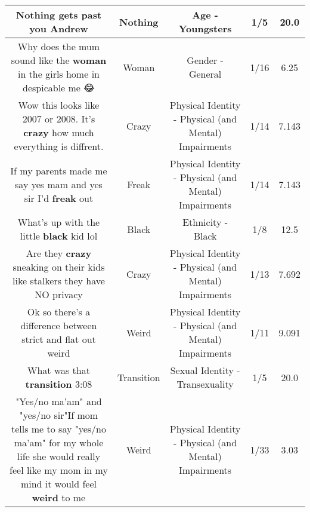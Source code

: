 \documentclass[11pt]{article}
\newlength\mylength
\begin{document}
\begin{center}
\begin{longtable}{|C{.65\mylength}|C{.30\mylength}|C{.12\mylength}|C{.12\mylength}|C{.12\mylength}|}
  \small Nothing gets past you Andrew\normalsize   & Nothing & Age - Youngsters & 1/5 & 20.0 \\  \hline
  \small Why does the mum sound like the \textbf{woman} in the girls home in despicable me 😂\normalsize   & Woman & Gender - General & 1/16 & 6.25 \\  \hline
  \small Wow this looks like 2007 or 2008. It's \textbf{crazy} how much everything is diffrent.\normalsize   & Crazy & Physical Identity - Physical (and Mental) Impairments & 1/14 & 7.143 \\  \hline
  \small If my parents made me say yes mam and yes sir I'd \textbf{freak} out\normalsize   & Freak & Physical Identity - Physical (and Mental) Impairments & 1/14 & 7.143 \\  \hline
  \small What's up with the little \textbf{black} kid lol\normalsize   & Black & Ethnicity - Black & 1/8 & 12.5 \\  \hline
  \small Are they \textbf{crazy} sneaking on their kids like stalkers they have NO privacy\normalsize   & Crazy & Physical Identity - Physical (and Mental) Impairments & 1/13 & 7.692 \\  \hline
  \small Ok so there's a difference between strict and flat out weird\normalsize   & Weird & Physical Identity - Physical (and Mental) Impairments & 1/11 & 9.091 \\  \hline
  \small What was that \textbf{transition} 3:08\normalsize   & Transition & Sexual Identity - Transexuality & 1/5 & 20.0 \\  \hline
  \small "Yes/no ma'am" and "yes/no sir"If mom tells me to say "yes/no ma'am" for my whole life she would really feel like my mom in my mind it would feel \textbf{weird} to me\normalsize   & Weird & Physical Identity - Physical (and Mental) Impairments & 1/33 & 3.03 \\  \hline

\end{longtable}
\end{center}
\end{document}
